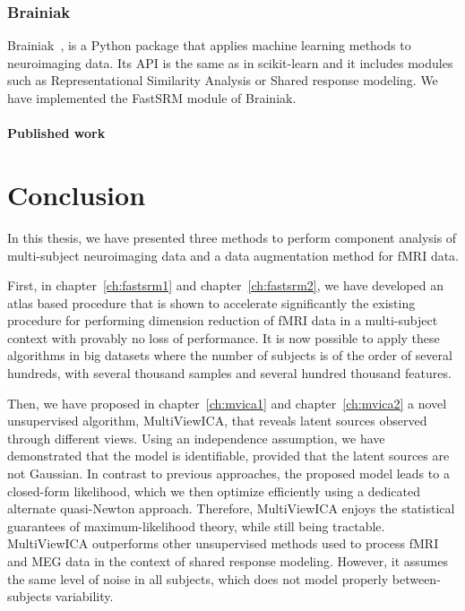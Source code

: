 \documentclass[ twoside,openright,titlepage,numbers=noenddot,%
                headinclude,footinclude,cleardoublepage=empty,abstract=on,
                BCOR=5mm,paper=a4,fontsize=11pt, 
                ]{scrreprt}
\begin{document}
\subsubsection{Brainiak}
Brainiak~\cite{kumar2020brainiak, kumar2020brainiak2}, is a Python package that applies machine
learning methods to neuroimaging data. Its API is the same as in scikit-learn
and it includes modules such as Representational Similarity Analysis or Shared
response modeling.
We have implemented the FastSRM module of Brainiak.


\paragraph{Published work}

\section{Conclusion}
In this thesis, we have presented three methods to perform component
analysis of multi-subject neuroimaging data and a data augmentation method for
fMRI data.

First, in chapter~\ref{ch:fastsrm1} and chapter~\ref{ch:fastsrm2}, we have developed an
atlas based procedure that is shown to accelerate significantly the existing
procedure for performing dimension reduction of fMRI data in a multi-subject
context with provably no loss of performance. It is now possible to apply these
algorithms in big datasets where the number of subjects is of the order of
several hundreds, with several thousand samples and several hundred thousand features.

Then, we have proposed in chapter~\ref{ch:mvica1} and chapter~\ref{ch:mvica2}
a novel unsupervised algorithm, MultiViewICA, that reveals latent sources observed through different views. Using an independence assumption, we have demonstrated that the model is identifiable, provided that the latent
sources are not Gaussian. In contrast to previous approaches, the proposed model leads to a closed-form likelihood, which we then optimize efficiently using a dedicated alternate quasi-Newton approach.
Therefore, MultiViewICA enjoys the statistical guarantees of maximum-likelihood
theory, while still being tractable. MultiViewICA outperforms other unsupervised
methods used to process fMRI and MEG data in the context of shared response modeling. However,
it assumes the same level of noise in all
subjects, which does not model properly between-subjects variability.
\end{document}
